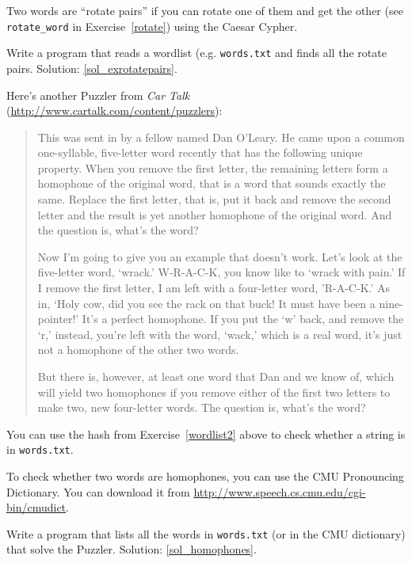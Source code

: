 \begin{exercise}
\label{exrotatepairs}

Two words are ``rotate pairs'' if you can rotate one of them
and get the other (see \verb"rotate_word" in 
Exercise~\ref{rotate}) using the Caesar Cypher.

Write a program that reads a wordlist (e.g. {\tt words.txt} 
and finds all the rotate pairs.  
Solution: \ref{sol_exrotatepairs}.

\end{exercise}


\begin{exercise}
\label{homophones}

Here's another Puzzler from {\em Car Talk} 
(\url{http://www.cartalk.com/content/puzzlers}):

\begin{quote}
This was sent in by a fellow named Dan O'Leary. He came upon a common
one-syllable, five-letter word recently that has the following unique
property. When you remove the first letter, the remaining letters form
a homophone of the original word, that is a word that sounds exactly
the same. Replace the first letter, that is, put it back and remove
the second letter and the result is yet another homophone of the
original word. And the question is, what's the word?

Now I'm going to give you an example that doesn't work. Let's look at
the five-letter word, `wrack.' W-R-A-C-K, you know like to `wrack with
pain.' If I remove the first letter, I am left with a four-letter
word, 'R-A-C-K.' As in, `Holy cow, did you see the rack on that buck!
It must have been a nine-pointer!' It's a perfect homophone. If you
put the `w' back, and remove the `r,' instead, you're left with the
word, `wack,' which is a real word, it's just not a homophone of the
other two words.

But there is, however, at least one word that Dan and we know of,
which will yield two homophones if you remove either of the first two
letters to make two, new four-letter words. The question is, what's
the word?
\end{quote}

You can use the hash from Exercise~\ref{wordlist2} above to check
whether a string is in {\tt words.txt}.

To check whether two words are homophones, you can use the CMU
Pronouncing Dictionary.  You can download it from
\url{http://www.speech.cs.cmu.edu/cgi-bin/cmudict}.

Write a program that lists all the words in {\tt words.txt} 
(or in the CMU dictionary) that solve the Puzzler.
Solution: \ref{sol_homophones}.

\end{exercise}


